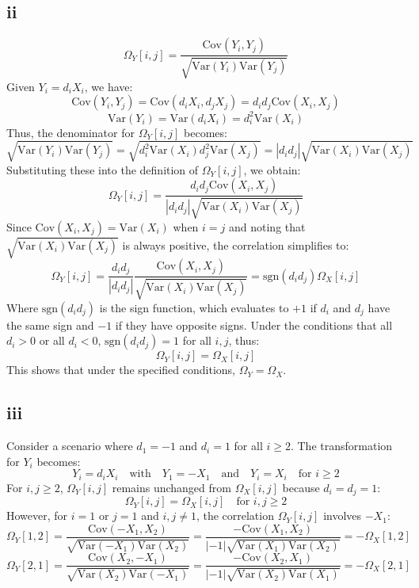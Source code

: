 \documentclass{article}
\begin{document}
\subsection*{ii}
\[
    \Omega_Y[i,j] = \frac{\text{Cov}(Y_i, Y_j)}{\sqrt{\text{Var}(Y_i) \text{Var}(Y_j)}}
\]
Given \(Y_i = d_i X_i\), we have:
\[
    \text{Cov}(Y_i, Y_j) = \text{Cov}(d_i X_i, d_j X_j) = d_i d_j \text{Cov}(X_i, X_j)
\]
\[
    \text{Var}(Y_i) = \text{Var}(d_i X_i) = d_i^2 \text{Var}(X_i)
\]
Thus, the denominator for \(\Omega_Y[i,j]\) becomes:
\[
    \sqrt{\text{Var}(Y_i) \text{Var}(Y_j)} = \sqrt{d_i^2 \text{Var}(X_i) d_j^2 \text{Var}(X_j)} = |d_i d_j| \sqrt{\text{Var}(X_i) \text{Var}(X_j)}
\]
Substituting these into the definition of \(\Omega_Y[i,j]\), we obtain:
\[
    \Omega_Y[i,j] = \frac{d_i d_j \text{Cov}(X_i, X_j)}{|d_i d_j| \sqrt{\text{Var}(X_i) \text{Var}(X_j)}}
\]
Since \(\text{Cov}(X_i, X_j) = \text{Var}(X_i)\) when \(i = j\) and noting that \(\sqrt{\text{Var}(X_i) \text{Var}(X_j)}\) is always positive, the correlation simplifies to:
\[
    \Omega_Y[i,j] = \frac{d_i d_j}{|d_i d_j|} \frac{\text{Cov}(X_i, X_j)}{\sqrt{\text{Var}(X_i) \text{Var}(X_j)}} = \text{sgn}(d_i d_j) \Omega_X[i,j]
\]
Where \(\text{sgn}(d_i d_j)\) is the sign function, which evaluates to \(+1\) if \(d_i\) and \(d_j\) have the same sign and \(-1\) if they have opposite signs. Under the conditions that all \(d_i > 0\) or all \(d_i < 0\), \(\text{sgn}(d_i d_j) = 1\) for all \(i, j\), thus:
\[
    \Omega_Y[i,j] = \Omega_X[i,j]
\]
This shows that under the specified conditions, \(\Omega_Y = \Omega_X\).
\subsection*{iii}
Consider a scenario where \(d_1 = -1\) and \(d_i = 1\) for all \(i \geq 2\). The transformation for \(Y_i\) becomes:
\[
    Y_i = d_i X_i \quad \text{with} \quad Y_1 = -X_1 \quad \text{and} \quad Y_i = X_i \quad \text{for } i \geq 2
\]
For \(i, j \geq 2\), \(\Omega_Y[i,j]\) remains unchanged from \(\Omega_X[i,j]\) because \(d_i = d_j = 1\):
\[
    \Omega_Y[i,j] = \Omega_X[i,j] \quad \text{for } i, j \geq 2
\]
However, for \(i = 1\) or \(j = 1\) and \(i, j \neq 1\), the correlation \(\Omega_Y[i,j]\) involves \(-X_1\):
\[
    \Omega_Y[1,2] = \frac{\text{Cov}(-X_1, X_2)}{\sqrt{\text{Var}(-X_1) \text{Var}(X_2)}} = \frac{-\text{Cov}(X_1, X_2)}{|-1| \sqrt{\text{Var}(X_1) \text{Var}(X_2)}} = -\Omega_X[1,2]
\]
\[
    \Omega_Y[2,1] = \frac{\text{Cov}(X_2, -X_1)}{\sqrt{\text{Var}(X_2) \text{Var}(-X_1)}} = \frac{-\text{Cov}(X_2, X_1)}{|-1| \sqrt{\text{Var}(X_2) \text{Var}(X_1)}} = -\Omega_X[2,1]
\]
\end{document}

